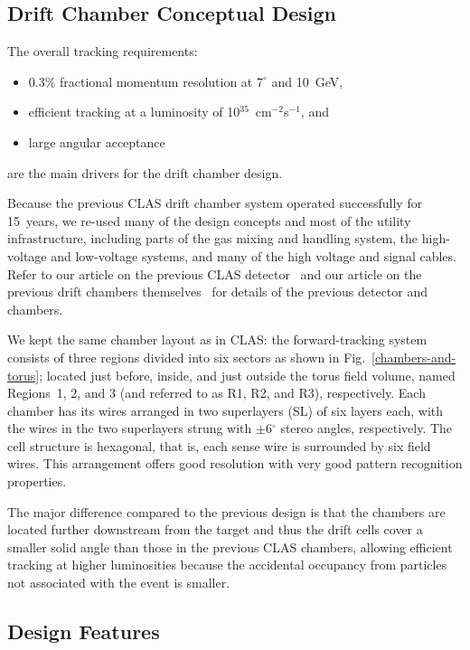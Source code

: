 \subsection{Drift Chamber Conceptual Design}

The overall tracking requirements:
\begin{itemize}
\item $0.3\%$ fractional momentum resolution at $7^{\circ}$ and 10~GeV, 
\item efficient tracking at a luminosity of 10$^{35}$~cm$^{-2}$s$^{-1}$, and
\item large angular acceptance 
\end{itemize}are the main drivers for the drift chamber design.  

Because the previous CLAS drift chamber system operated 
successfully for 15~years, we re-used many of the design concepts and 
most of the utility infrastructure, including
parts of the gas mixing and handling system, the high-voltage 
and low-voltage systems, and many of the high voltage and signal cables. 
Refer to our article on the previous CLAS detector~\cite{clasnim} and our article 
on the previous drift chambers themselves~\cite{dcnim} for details of the 
previous detector and chambers.  

We kept the same chamber layout as in CLAS:
the forward-tracking system consists of three regions divided into six
sectors as shown in Fig.~\ref{chambers-and-torus}; located just before, inside, 
and just outside the torus field volume, named Regions~1, 2, 
and 3 (and referred to as R1, R2, and R3), respectively.  
Each chamber has its wires arranged in two superlayers (SL) of
six layers each, with the wires in the two superlayers strung with 
$\pm$6$^\circ$ stereo angles, respectively.  The cell structure is 
hexagonal, that is, each sense wire is surrounded by six field wires.  This 
arrangement offers good resolution with very good pattern recognition properties.  

The major difference compared to the previous design is that the 
chambers are located further downstream from the target and thus the drift
cells cover a smaller solid angle than those in the previous CLAS 
chambers, allowing efficient tracking at higher luminosities because the 
accidental occupancy from particles not associated with the event is smaller.  

\subsection{Design Features}

